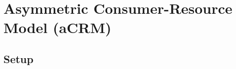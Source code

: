 \documentclass[10pt]{article}
\newcommand{\Var}[1]{\mathrm{Var}\left[ #1 \right]}
\begin{document}

\newpage
\section{Asymmetric Consumer-Resource Model (aCRM)}

\subsection{Setup}
\end{document}
